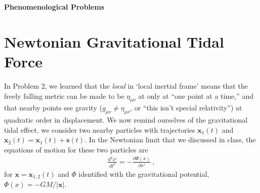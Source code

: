 \documentclass[12pt]{article}
\numberwithin{equation}{section}    %
\renewcommand{\vec}[1]{\mathbf{#1}} %
\begin{document}
%



\vspace{2em}
{\Large\textbf{\textsf{Phenomenological Problems}}}

\section{Newtonian Gravitational Tidal Force}

In Problem 2, we learned that the \emph{local} in `local inertial frame' means that the freely falling metric can be made to be $\eta_{\mu\nu}$ at only at ``one point at a time,'' and that nearby points see gravity ($g_{\mu\nu} \neq \eta_{\mu\nu}$, or ``this isn't special relativity'') at quadratic order in displacement. We now remind ourselves of the gravitational tidal effect, we consider two nearby particles with trajectories $\vec{x}_1(t)$ and $\vec{x}_2(t)=\vec{x}_1(t)+ \vec{s}(t)$. In the Newtonian limit that we discussed in class, the equations of motion for these two particles are
\begin{align}
	\frac{d^2 x^i}{dt^2} = - \frac{\partial \Phi(x)}{\partial x^i} \ ,
\end{align}
for $\vec{x} = \vec{x}_{1,2}(t)$ and $\Phi$ identified with the gravitational potential, $\Phi(x) = -GM/|\vec x|$.
\end{document}
